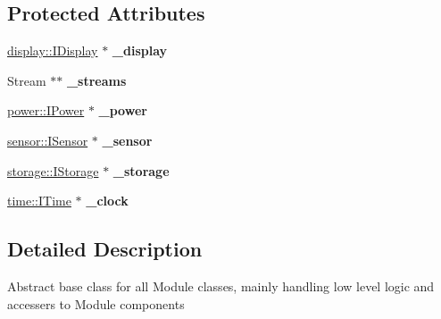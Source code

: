 \subsection*{Protected Attributes}
\begin{DoxyCompactItemize}
\item 
\mbox{\label{classathome_1_1module_1_1_a_base_module_a1abf0c4e3eeb4824582f79a1d18c2b4c}} 
\mbox{\hyperlink{classathome_1_1display_1_1_i_display}{display\+::\+I\+Display}} $\ast$ {\bfseries \+\_\+display}
\item 
\mbox{\label{classathome_1_1module_1_1_a_base_module_a895fb5050ad2395c25a2e2b6f6e11986}} 
Stream $\ast$$\ast$ {\bfseries \+\_\+streams}
\item 
\mbox{\label{classathome_1_1module_1_1_a_base_module_ae4d60b3b0a69540cdef4bb1db08782ad}} 
\mbox{\hyperlink{classathome_1_1power_1_1_i_power}{power\+::\+I\+Power}} $\ast$ {\bfseries \+\_\+power}
\item 
\mbox{\label{classathome_1_1module_1_1_a_base_module_ae1a2e5cb4bd4a76cdf248c19110bd3ba}} 
\mbox{\hyperlink{classathome_1_1sensor_1_1_i_sensor}{sensor\+::\+I\+Sensor}} $\ast$ {\bfseries \+\_\+sensor}
\item 
\mbox{\label{classathome_1_1module_1_1_a_base_module_aa62dad921ff7db37a8501aa827f73e4f}} 
\mbox{\hyperlink{classathome_1_1storage_1_1_i_storage}{storage\+::\+I\+Storage}} $\ast$ {\bfseries \+\_\+storage}
\item 
\mbox{\label{classathome_1_1module_1_1_a_base_module_ab5862f9f3fc958e285eb86eb41ffe7e1}} 
\mbox{\hyperlink{structathome_1_1time_1_1_i_time}{time\+::\+I\+Time}} $\ast$ {\bfseries \+\_\+clock}
\end{DoxyCompactItemize}


\subsection{Detailed Description}
Abstract base class for all Module classes, mainly handling low level logic and accessers to Module components 

